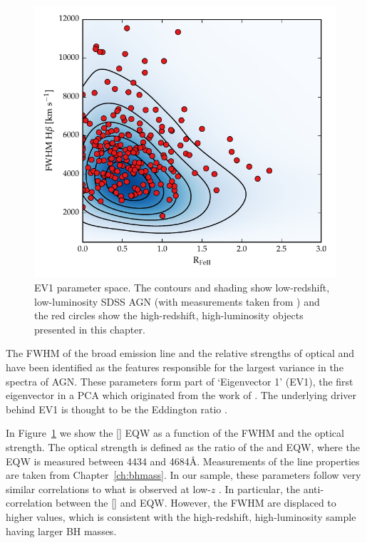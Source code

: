 \begin{figure}
    \includegraphics[width=\columnwidth]{figures/chapter04/ev1_lowz.pdf} 
    \caption{\ac{EV1} parameter space. The contours and shading show low-redshift, low-luminosity SDSS \ac{AGN} (with measurements taken from \citet{shen11}) and the red circles show the high-redshift, high-luminosity objects presented in this chapter.}      
    \label{fig:ev1_lowz}
\end{figure}

The \ac{FWHM} of the broad \hb emission line and the relative strengths of optical  and \hb have been identified as the features responsible for the largest variance in the spectra of AGN. 
These parameters form part of `Eigenvector 1' (EV1), the first eigenvector in a \ac{PCA} which originated from the work of \citet{boroson92}.   
The underlying driver behind EV1 is thought to be the Eddington ratio \citep[e.g.][]{sulentic00b,shen14}. 

In Figure~\ref{fig:ev1_lowz} we show the [] \ac{EQW} as a function of the \hb \ac{FWHM} and the optical  strength. 
The optical  strength is defined as the ratio of the  and \hb \ac{EQW}, where the  \ac{EQW} is measured between 4434 and 4684\AA.
Measurements of the \hb line properties are taken from Chapter~\ref{ch:bhmass}. 
In our sample, these parameters follow very similar correlations to what is observed at low-$z$ \citep[see also][]{sulentic04, shen16a}.
In particular, the anti-correlation between the [] and  \ac{EQW}.  
However, the \hb \ac{FWHM} are displaced to higher values, which is consistent with the high-redshift, high-luminosity sample having larger \ac{BH} masses. 

